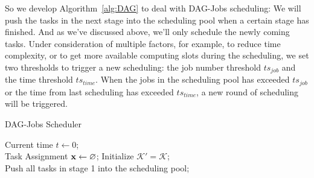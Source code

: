 \documentclass{llncs}
\begin{document}
So we develop Algorithm~\ref{alg:DAG} to deal with DAG-Jobs scheduling: We will push the tasks in the next stage into the scheduling pool when a certain stage has finished. And as we've discussed above, we'll only schedule the newly coming tasks. Under consideration of multiple factors, for example, to reduce time complexity, or to get more available computing slots during the scheduling, we set two thresholds to trigger a new scheduling: the job number threshold $ts_{job}$ and the time threshold $ts_{time}$.  When the jobs in the scheduling pool has exceeded $ts_{job}$ or the time from last scheduling has exceeded $ts_{time}$, a new round of scheduling will be triggered. 
\begin{algorithm}
\BlankLine
\caption{DAG-Jobs Scheduler}
\label{alg:DAG}
\BlankLine
Current time $t \leftarrow 0$; \\
Task Assignment $\bold{x} \leftarrow \varnothing$;
Initialize $\mathcal{K'}=\mathcal{K}$; \\
Push all tasks in stage 1 into the scheduling pool; \\
\end{algorithm}
\end{document}
